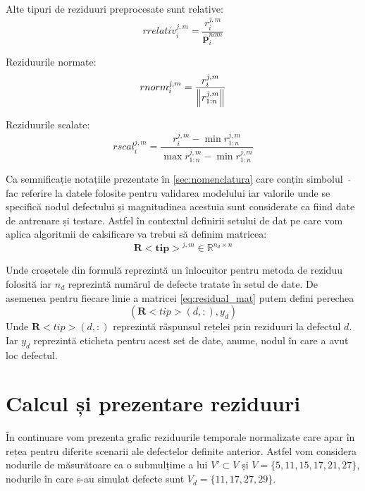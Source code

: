 Alte tipuri de reziduuri preprocesate sunt relative:
\begin{equation}
rrelativ_i^{j,m} = \frac{r_i^{j,m}}{\overline{\mathbf{p}}_i^{nom}} 
\label{eq:relative_residual}
\end{equation}

Reziduurile normate:
\begin{equation}
rnorm_{i}^{j,m} =  \frac{r_i^{j,m}}{ \left\lVert r_{1:n}^{j,m}\right\rVert} 
\label{eq:norm_residual}
\end{equation}

Reziduurile scalate:
\begin{equation}
rscal_{i}^{j,m} = \frac{r_i^{j,m} - \min r_{1:n}^{j,m}}{ \max r_{1:n}^{j,m} -  \min r_{1:n}^{j,m}}
\label{eq:scaled_residual}
\end{equation}


Ca semnificație notațiile prezentate în \ref{sec:nomenclatura} care conțin simbolul~ $\widehat{}$~ fac referire la datele folosite pentru validarea modelului iar valorile unde se specifică nodul defectului și magnitudinea acestuia sunt considerate ca fiind date de antrenare și testare. Astfel în contextul definirii setului de dat pe care vom aplica algoritmii de calsificare va trebui să definim matricea:
\begin{equation}
\mathbf{R<tip>}^{j, m} \in \mathbb{R}^{n_{d} \times n}
\label{eq:residual_mat}
\end{equation}

Unde croșetele din formulă reprezintă un înlocuitor pentru metoda de reziduu folosită iar $n_{d}$ reprezintă numărul de defecte tratate în setul de date. De asemenea pentru fiecare linie a matricei \eqref{eq:residual_mat} putem defini perechea
\begin{equation}
\left( \mathbf{R}<tip>(d,:), y_{d} \right)
\label{eq:residual_label}
\end{equation} 
Unde $ \mathbf{R}<tip>(d,:)$ reprezintă răspunsul rețelei prin reziduuri la defectul $d$. Iar $y_{d}$ reprezintă eticheta pentru acest set de date, anume, nodul în care a avut loc defectul.

\section{Calcul și prezentare reziduuri}
În continuare vom prezenta grafic reziduurile temporale normalizate care apar în rețea pentru diferite scenarii ale defectelor definite anterior.
Astfel vom considera nodurile de măsurătoare ca o submulțime  a lui $V' \subset V$ și $ V = \{5, 11, 15, 17, 21, 27\}$, nodurile în care s-au simulat defecte sunt $V_{d} = \{11, 17, 27,29\}$.

